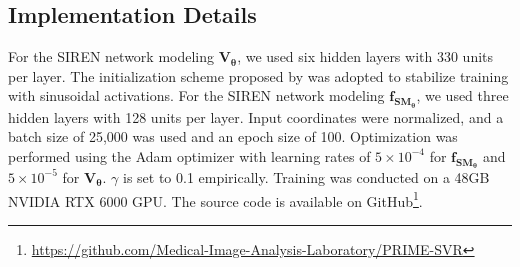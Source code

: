 \documentclass[preprint,authoryear,12pt]{elsarticle}
\begin{document}
\subsection{Implementation Details}
\label{sec:implementationdetails}
For the SIREN network modeling $\mathbf{V_{\theta}}$, we used six hidden layers with 330 units per layer. The initialization scheme proposed by \cite{sitzmann_implicit_2020} was adopted to stabilize training with sinusoidal activations. %
For the SIREN network modeling $\mathbf{f_{SM_{\theta}}}$, we used three hidden layers with 128 units per layer. Input coordinates were normalized, and a batch size of 25,000 was used and an epoch size of 100. Optimization was performed using the Adam optimizer with learning rates of $5 \times 10^{-4}$ for $\mathbf{f_{SM_{\theta}}}$ and $5 \times 10^{-5}$ for $\mathbf{V_{\theta}}$. $\gamma$ is set to 0.1 empirically. Training was conducted on a 48GB NVIDIA RTX 6000 GPU. The source code is available on GitHub\footnote{\url{https://github.com/Medical-Image-Analysis-Laboratory/PRIME-SVR}}.
\end{document}
